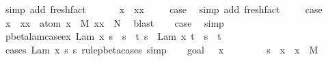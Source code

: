 \begin{isabellebody}
\ {\isacharparenleft}simp\ add{\isacharcolon}\ fresh{\isacharunderscore}fact{\isacharparenright}\ \isacommand{{\isacharbraceright}}\isamarkupfalse%
\isanewline
\ \ \isacommand{{\isacharbraceleft}}\isamarkupfalse%
\ \isamarkupfalse%
\ {\isachardoublequoteopen}x\ {\isasymnoteq}\ xx{\isachardoublequoteclose}\ \isamarkupfalse%
\ {}\ \isamarkupfalse%
\ {\isacharquery}case\ \isamarkupfalse%
\ {\isacharparenleft}simp\ add{\isacharcolon}\ fresh{\isacharunderscore}fact{\isacharparenright}\ \isacommand{{\isacharbraceright}}\isamarkupfalse%
\isanewline
\ \ \isamarkupfalse%
\ {\isacharquery}case\ \isamarkupfalse%
\ {\isacartoucheopen}x\ {\isacharequal}\ xx\ {\isasymLongrightarrow}\ atom\ x\ {\isasymsharp}\ M{\isacharprime}\ {\isacharbrackleft}xx\ {\isacharcolon}{\isacharcolon}{\isacharequal}\ N{\isacharprime}{\isacharbrackright}{\isacartoucheclose}\ \isamarkupfalse%
\ blast\isanewline
{}\isamarkupfalse%
\isanewline
{}\isamarkupfalse%
\ {}\ \isamarkupfalse%
\ {\isacharquery}case\ \isamarkupfalse%
\ simp\isanewline
{}\isamarkupfalse%
%
\endisatagproof
{\isafoldproof}%
%
\isadelimproof
\isanewline
%
\endisadelimproof
\isanewline
{}\isamarkupfalse%
\ pbeta{\isacharunderscore}lam{\isacharunderscore}case{\isacharunderscore}ex{\isacharcolon}\ {\isachardoublequoteopen}{\isacharparenleft}Lam\ {\isacharbrackleft}x{\isacharbrackright}{\isachardot}\ s{\isacharparenright}\ {\isasymggreater}\ s{\isacharprime}\ {\isasymLongrightarrow}\ {\isasymexists}t{\isachardot}\ s{\isacharprime}\ {\isacharequal}\ Lam\ {\isacharbrackleft}x{\isacharbrackright}{\isachardot}\ t\ {\isasymand}\ s\ {\isasymggreater}\ t{\isachardoublequoteclose}\isanewline
%
\isadelimproof
%
\endisadelimproof
%
\isatagproof
{}\isamarkupfalse%
\ {\isacharparenleft}cases\ {\isachardoublequoteopen}{\isacharparenleft}Lam\ {\isacharbrackleft}x{\isacharbrackright}{\isachardot}\ s{\isacharparenright}{\isachardoublequoteclose}\ s{\isacharprime}\ rule{\isacharcolon}pbeta{\isachardot}cases{\isacharcomma}\ simp{\isacharparenright}\isanewline
\ \ \isamarkupfalse%
\ {\isacharparenleft}goal{}\ {\isacharunderscore}\ {\isacharunderscore}\ x{\isacharprime}{\isacharparenright}\isanewline
\ \ \ \ \isamarkupfalse%
\ \isamarkupfalse%
\ {}{\isacharcolon}\ {\isachardoublequoteopen}s\ {\isasymggreater}\ {\isacharparenleft}{\isacharparenleft}x{\isacharprime}\ {\isasymleftrightarrow}\ x{\isacharparenright}\ {\isasymbullet}\ M{\isacharprime}{\isacharparenright}{\isachardoublequoteclose}\ \isamarkupfalse%

\end{isabellebody}

